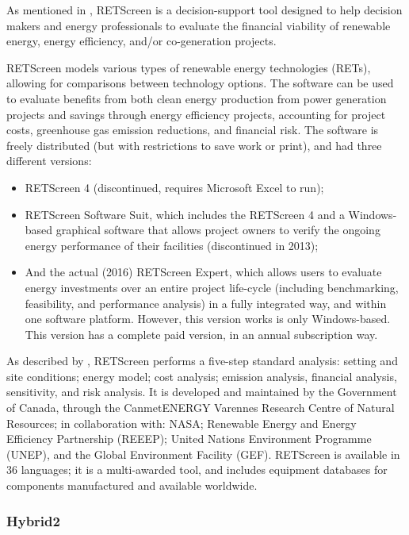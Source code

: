 As mentioned in \cite{Pradhan}, RETScreen is a decision-support tool designed to help decision makers and energy professionals to evaluate the financial viability of renewable energy, energy efficiency, and/or co-generation projects.

RETScreen models various types of renewable energy technologies (RETs), allowing for comparisons between technology options. The software can be used to evaluate benefits from both clean energy production from power generation projects and savings through energy efficiency projects, accounting for project costs, greenhouse gas emission reductions, and financial risk. The software is freely distributed (but with restrictions to save work or print), and had three different versions:

\begin{itemize}
\item RETScreen 4 (discontinued, requires Microsoft Excel to run); 
\item RETScreen Software Suit, which includes the RETScreen 4 and a Windows-based graphical software that allows project owners to verify the ongoing energy performance of their facilities (discontinued in 2013);
\item And the actual (2016) RETScreen Expert, which allows users to evaluate energy investments over an entire project life-cycle (including benchmarking, feasibility, and performance analysis) in a fully integrated way, and within one software platform. However, this version works is only Windows-based. This version has a complete paid version, in an annual subscription way.
\end{itemize}

As described by \cite{Pradhan}, RETScreen performs a five-step standard analysis: setting and site conditions; energy model; cost analysis; emission analysis, financial analysis, sensitivity, and risk analysis. It is developed and maintained by the Government of Canada, through the CanmetENERGY Varennes Research Centre of Natural Resources; in collaboration with: NASA; Renewable Energy and Energy Efficiency Partnership (REEEP); United Nations Environment Programme (UNEP), and the Global Environment Facility (GEF). RETScreen is available in 36 languages; it is a multi-awarded tool, and includes equipment databases for components manufactured and available worldwide.

\subsubsection{Hybrid2}

